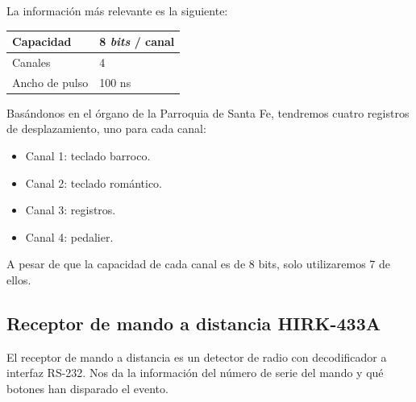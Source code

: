 \smallskip

La información más relevante es la siguiente:

\begin{center}
		\begin{tabular}{|l|l|}
		\hline Capacidad & 8 \textit{bits} / canal \\ 
		\hline Canales & 4 \\ 
		\hline Ancho de pulso & 100 ns \\ 
		\hline 
	\end{tabular}
\end{center}

Basándonos en el órgano de la Parroquia de Santa Fe, tendremos cuatro registros de desplazamiento, uno para cada canal:

\begin{itemize}
	\item Canal 1: teclado barroco.
	\item Canal 2: teclado romántico.
	\item Canal 3: registros.
	\item Canal 4: pedalier.
\end{itemize}

A pesar de que la capacidad de cada canal es de 8 bits, solo utilizaremos 7 de ellos.

\subsection{Receptor de mando a distancia HIRK-433A}

El receptor de mando a distancia es un detector de radio con decodificador a interfaz RS-232. Nos da la información del número de serie del mando y qué botones han disparado el evento. 

\smallskip

